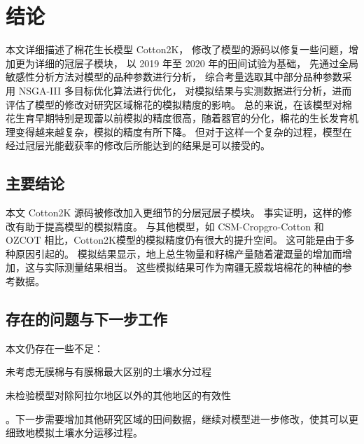\chapter{结论}
本文详细描述了棉花生长模型 Cotton2K，%
修改了模型的源码以修复一些问题，增加更为详细的冠层子模块，%
以 2019 年至 2020 年的田间试验为基础，%
先通过全局敏感性分析方法对模型的品种参数进行分析，%
综合考量选取其中部分品种参数采用 NSGA-III 多目标优化算法进行优化，%
对模拟结果与实测数据进行分析，进而评估了模型的修改对研究区域棉花的模拟精度的影响。%
总的来说，在该模型对棉花生育早期特别是现蕾以前模拟的精度很高，随着器官的分化，棉花的生长发育机理变得越来越复杂，模拟的精度有所下降。%
但对于这样一个复杂的过程，模型在经过冠层光能截获率的修改后所能达到的结果是可以接受的。%

\section{主要结论}

本文 Cotton2K 源码被修改加入更细节的分层冠层子模块。%
事实证明，这样的修改有助于提高模型的模拟精度。
与其他模型，如 CSM-Cropgro-Cotton 和 OZCOT 相比，Cotton2K模型的模拟精度仍有很大的提升空间。%
这可能是由于多种原因引起的。%
模拟结果显示，地上总生物量和籽棉产量随着灌溉量的增加而增加，这与实际测量结果相当。%
这些模拟结果可作为南疆无膜栽培棉花的种植的参考数据。

\section{存在的问题与下一步工作}

本文仍存在一些不足：
\begin{enumerate*}
    \item 未考虑无膜棉与有膜棉最大区别的土壤水分过程
    \item 未检验模型对除阿拉尔地区以外的其他地区的有效性
\end{enumerate*}。下一步需要增加其他研究区域的田间数据，继续对模型进一步修改，使其可以更细致地模拟土壤水分运移过程。